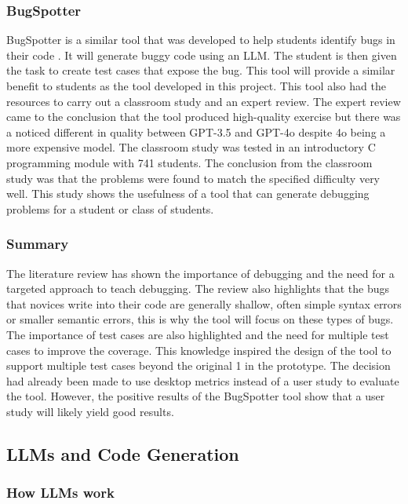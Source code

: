 \documentclass[12pt]{extarticle}
\begin{document}
\subsubsection{BugSpotter}

BugSpotter is a similar tool that was developed to help students identify bugs in their code \cite{Victor2025}. It will generate buggy code using an LLM. The student is then given the task to create test cases that expose the bug. This tool will provide a similar benefit to students as the tool developed in this project. This tool also had the resources to carry out a classroom study and an expert review. The expert review came to the conclusion that the tool produced high-quality exercise but there was a noticed different in quality between GPT-3.5 and GPT-4o despite 4o being a more expensive model. The classroom study was tested in an introductory C programming module with 741 students. The conclusion from the classroom study was that the problems were found to match the specified difficulty very well. This study shows the usefulness of a tool that can generate debugging problems for a student or class of students.

\subsubsection{Summary}

The literature review has shown the importance of debugging and the need for a targeted approach to teach debugging. The review also highlights that the bugs that novices write into their code are generally shallow, often simple syntax errors or smaller semantic errors, this is why the tool will focus on these types of bugs. The importance of test cases are also highlighted and the need for multiple test cases to improve the coverage. This knowledge inspired the design of the tool to support multiple test cases beyond the original 1 in the prototype. The decision had already been made to use desktop metrics instead of a user study to evaluate the tool. However, the positive results of the BugSpotter tool show that a user study will likely yield good results.

\subsection{LLMs and Code Generation}
\subsubsection{How LLMs work}
\end{document}
